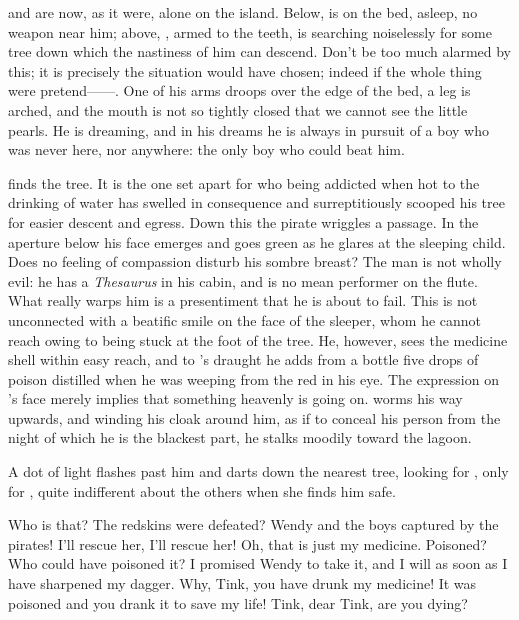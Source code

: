 \begin{drama}
{\hook and \peter are now, as it were, alone on the island.
Below, \peter is on the bed, asleep, no weapon near him;
above, \hook, armed to the teeth, is searching noiselessly for some tree down which the nastiness of him can descend.
Don’t be too much alarmed by this; it is precisely the situation \peter would have chosen;
indeed if the whole thing were pretend——.
One of his arms droops over the edge of the bed, a leg is arched,
and the mouth is not so tightly closed that we cannot see the little pearls.
He is dreaming, and in his dreams he is always in pursuit of a boy who was never here, nor anywhere:
the only boy who could beat him.

\hook finds the tree.
It is the one set apart for \slightly who being addicted when hot to the drinking of water has swelled in consequence
and surreptitiously scooped his tree for easier descent and egress.
Down this the pirate wriggles a passage.
In the aperture below his face emerges and goes green as he glares at the sleeping child.
Does no feeling of compassion disturb his sombre breast?
The man is not wholly evil: he has a \emph{Thesaurus} in his cabin, and is no mean performer on the flute.
What really warps him is a presentiment that he is about to fail.
This is not unconnected with a beatific smile on the face of the sleeper,
whom he cannot reach owing to being stuck at the foot of the tree.
He, however, sees the medicine shell within easy reach,
and to \wendy’s draught he adds from a bottle five drops of poison
distilled when he was weeping from the red in his eye.
The expression on \peter’s face merely implies that something heavenly is going on.
\hook worms his way upwards, and winding his cloak around him,
as if to conceal his person from the night of which he is the blackest part,
he stalks moodily toward the lagoon.

A dot of light flashes past him and darts down the nearest tree, looking for \peter, only for \peter,
quite indifferent about the others when she finds him safe.}

Who is that?
The redskins were defeated?
Wendy and the boys captured by the pirates!
I’ll rescue her, I’ll rescue her!
Oh, that is just my medicine.
Poisoned?
Who could have poisoned it?
I promised Wendy to take it, and I will as soon as I have sharpened my dagger.
Why, Tink, you have drunk my medicine!
It was poisoned and you drank it to save my life!
Tink, dear Tink, are you dying?


\end{drama}
